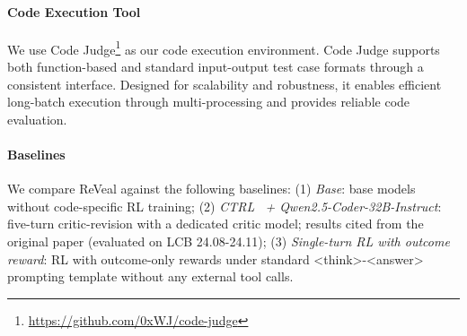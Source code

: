 \documentclass{article} %
\begin{document}
\paragraph{Code Execution Tool} We use Code Judge\footnote{\url{https://github.com/0xWJ/code-judge}} as our code execution environment. Code Judge supports both function-based and standard input-output test case formats through a consistent interface. Designed for scalability and robustness, it enables efficient long-batch execution through multi-processing and provides reliable code evaluation.
\paragraph{Baselines}
We compare ReVeal against the following baselines: (1) \textit{Base}: base models without code-specific RL training; (2) \textit{CTRL~\citep{xie2025teachinglanguagemodelscritique} + Qwen2.5-Coder-32B-Instruct}: five-turn critic-revision with a dedicated critic model; results cited from the original paper (evaluated on LCB 24.08-24.11); (3) \textit{Single-turn RL with outcome reward}: RL with outcome-only rewards under standard <think>-<answer> prompting template without any external tool calls. %
\end{document}
